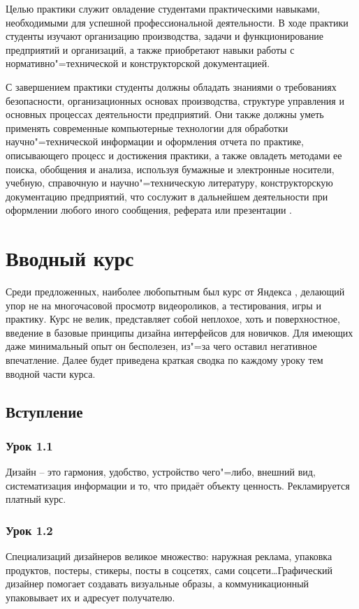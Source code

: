 \documentclass[variant=practice]{bsuir}
\begin{document}
Целью практики служит овладение студентами практическими навыками, необходимыми
для успешной профессиональной деятельности. В ходе практики студенты изучают
организацию производства, задачи и функционирование предприятий и организаций, а
также приобретают навыки работы с нормативно"=технической и конструкторской
документацией.

С завершением практики студенты должны обладать знаниями о требованиях
безопасности, организационных основах производства, структуре управления и
основных процессах деятельности предприятий. Они также должны уметь применять
современные компьютерные технологии для обработки научно"=технической информации
и оформления отчета по практике, описывающего процесс и достижения практики, а
также овладеть методами ее поиска, обобщения и анализа, используя бумажные и
электронные носители, учебную, справочную и научно"=техническую литературу,
конструкторскую документацию предприятий, что сослужит в дальнейшем деятельности
при оформлении любого иного сообщения, реферата или презентации
\cite{about-practice}.

\chapter{Вводный курс }

Среди предложенных, наиболее любопытным был курс от Яндекса \cite{about-yandex},
делающий упор не на многочасовой просмотр видеороликов, а тестирования, игры и
практику. Курс не велик, представляет собой неплохое, хоть и поверхностное,
введение в базовые принципы дизайна интерфейсов для новичков. Для имеющих даже
минимальный опыт он бесполезен, из"=за чего оставил негативное впечатление.
Далее будет приведена краткая сводка по каждому уроку тем вводной части курса.

\section{Вступление}

\subsection{Урок 1.1} Дизайн -- это гармония, удобство, устройство чего"=либо,
внешний вид, систематизация информации и то, что придаёт объекту ценность.
Рекламируется платный курс.

\subsection{Урок 1.2} Специализаций дизайнеров великое множество: наружная
реклама, упаковка продуктов, постеры, стикеры, посты в соцсетях, сами
соцсети\dots Графический дизайнер помогает создавать визуальные образы, а
коммуникационный упаковывает их и адресует получателю.
\end{document}
